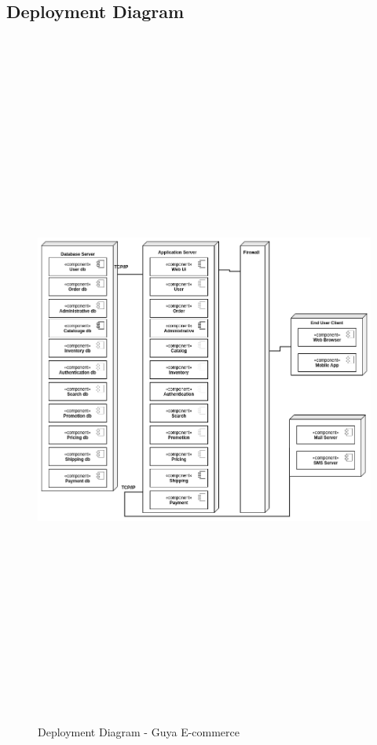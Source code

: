 \subsection{Deployment Diagram}
\begin{figure}[!h]
\hspace{-2cm}
\includegraphics[height=23cm, width=20cm, keepaspectratio]{usecases/shop_deployment_diagram.png}
\caption{Deployment Diagram - Guya E-commerce}
\end{figure}

